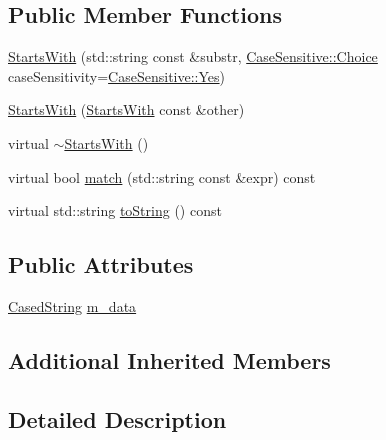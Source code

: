 \subsection*{Public Member Functions}
\begin{DoxyCompactItemize}
\item 
\hyperlink{struct_catch_1_1_matchers_1_1_impl_1_1_std_string_1_1_starts_with_a0db1bd8876219464ae60346c9525bcf6}{Starts\+With} (std\+::string const \&substr, \hyperlink{struct_catch_1_1_case_sensitive_aad49d3aee2d97066642fffa919685c6a}{Case\+Sensitive\+::\+Choice} case\+Sensitivity=\hyperlink{struct_catch_1_1_case_sensitive_aad49d3aee2d97066642fffa919685c6aa7c5550b69ec3c502e6f609b67f9613c6}{Case\+Sensitive\+::\+Yes})
\item 
\hyperlink{struct_catch_1_1_matchers_1_1_impl_1_1_std_string_1_1_starts_with_a5526cb587632e7e46253d6f60ae01098}{Starts\+With} (\hyperlink{struct_catch_1_1_matchers_1_1_impl_1_1_std_string_1_1_starts_with}{Starts\+With} const \&other)
\item 
virtual \hyperlink{struct_catch_1_1_matchers_1_1_impl_1_1_std_string_1_1_starts_with_ad22a0d01b6c29bd4784ffff988e99992}{$\sim$\+Starts\+With} ()
\item 
virtual bool \hyperlink{struct_catch_1_1_matchers_1_1_impl_1_1_std_string_1_1_starts_with_ab8f8d15e06d7ec13fee7d9ec4075dafa}{match} (std\+::string const \&expr) const
\item 
virtual std\+::string \hyperlink{struct_catch_1_1_matchers_1_1_impl_1_1_std_string_1_1_starts_with_a85a24e2ac23025edbe31cbf5bb755fb3}{to\+String} () const
\end{DoxyCompactItemize}
\subsection*{Public Attributes}
\begin{DoxyCompactItemize}
\item 
\hyperlink{struct_catch_1_1_matchers_1_1_impl_1_1_std_string_1_1_cased_string}{Cased\+String} \hyperlink{struct_catch_1_1_matchers_1_1_impl_1_1_std_string_1_1_starts_with_accaace83106244c635d251addb028125}{m\+\_\+data}
\end{DoxyCompactItemize}
\subsection*{Additional Inherited Members}


\subsection{Detailed Description}


